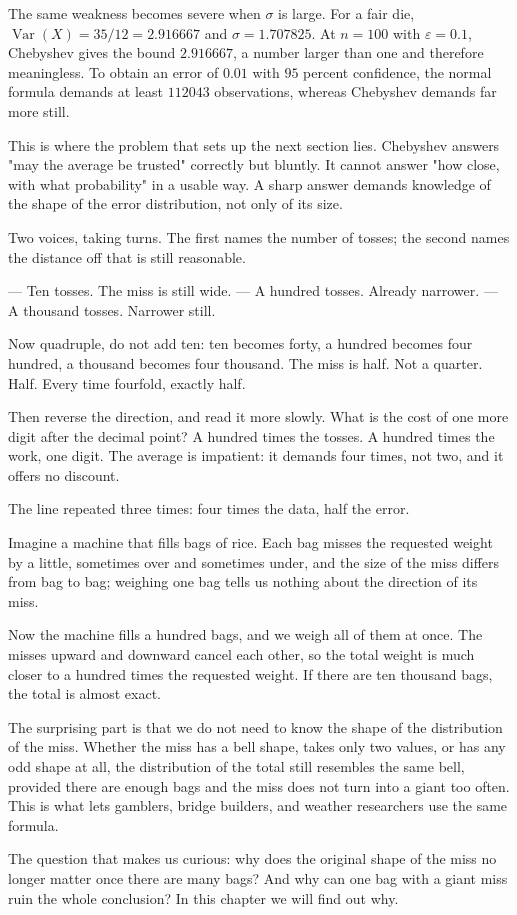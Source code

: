 The same weakness becomes severe when $\sigma$ is large. For a fair die,
$\operatorname{Var}(X)=35/12=2.916667$ and $\sigma=1.707825$. At $n=100$ with
$\varepsilon=0.1$, Chebyshev gives the bound $2.916667$, a number larger than
one and therefore meaningless. To obtain an error of $0.01$ with $95$ percent
confidence, the normal formula demands at least $112043$ observations, whereas
Chebyshev demands far more still.

This is where the problem that sets up the next section lies. Chebyshev answers "may
the average be trusted" correctly but bluntly. It cannot answer "how close, with
what probability" in a usable way. A sharp answer demands knowledge of the shape of
the error distribution, not only of its size.

\begin{bacakeras}
Two voices, taking turns. The first names the number of tosses; the second names the
distance off that is still reasonable.

--- Ten tosses. The miss is still wide.
--- A hundred tosses. Already narrower.
--- A thousand tosses. Narrower still.

Now quadruple, do not add ten: ten becomes forty, a hundred becomes four hundred, a
thousand becomes four thousand. The miss is half. Not a quarter. Half. Every time
fourfold, exactly half.

Then reverse the direction, and read it more slowly. What is the cost of one more
digit after the decimal point? A hundred times the tosses. A hundred times the work,
one digit. The average is impatient: it demands four times, not two, and it offers
no discount.

The line repeated three times: four times the data, half the error.
\end{bacakeras}

\begin{untukanak}
Imagine a machine that fills bags of rice. Each bag misses the requested weight by a
little, sometimes over and sometimes under, and the size of the miss differs from
bag to bag; weighing one bag tells us nothing about the direction of its miss.

Now the machine fills a hundred bags, and we weigh all of them at once. The misses
upward and downward cancel each other, so the total weight is much closer to a
hundred times the requested weight. If there are ten thousand bags, the total is
almost exact.

The surprising part is that we do not need to know the shape of the distribution of
the miss. Whether the miss has a bell shape, takes only two values, or has any odd
shape at all, the distribution of the total still resembles the same bell, provided
there are enough bags and the miss does not turn into a giant too often. This is
what lets gamblers, bridge builders, and weather researchers use the same formula.

The question that makes us curious: why does the original shape of the miss no
longer matter once there are many bags? And why can one bag with a giant miss ruin
the whole conclusion? In this chapter we will find out why.
\end{untukanak}

